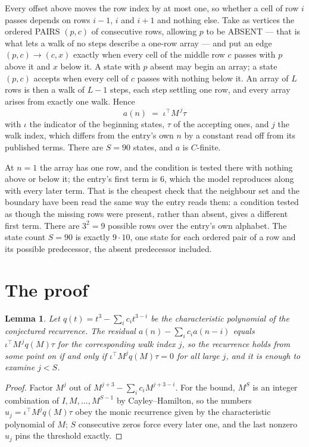 \documentclass[11pt,a4paper]{article}
\theoremstyle{plain}
\newtheorem{lemma}[theorem]{Lemma}
\theoremstyle{definition}
\begin{document}
Every offset above moves the row index by at most one, so whether a cell of row $i$ passes
depends on rows $i-1$, $i$ and $i+1$ and nothing else. Take as vertices the ordered PAIRS
$(p,c)$ of consecutive rows, allowing $p$ to be ABSENT --- that is what lets a walk of no steps
describe a one-row array --- and put an edge $(p,c)\to(c,x)$ exactly when every cell of the
middle row $c$ passes with $p$ above it and $x$ below it. A state with $p$ absent may begin an
array; a state $(p,c)$ accepts when every cell of $c$ passes with nothing below it. An array of
$L$ rows is then a walk of $L-1$ steps, each step settling one row, and every array arises from
exactly one walk. Hence
\[
a(n)\;=\;\iota^{\!\top}M^{\,j}\tau
\]
with $\iota$ the indicator of the beginning states, $\tau$ of the accepting ones, and $j$ the
walk index, which differs from the entry's own $n$ by a constant read off from its published
terms. There are $S=90$ states, and $a$ is $C$-finite.

At $n=1$ the array has one row, and
the condition is tested there with nothing above or below it; the entry's first term is
$6$, which the model reproduces along with every later term. That is the cheapest check
that the neighbour set and the boundary have been read the same way the entry reads them: a
condition tested as though the missing rows were present, rather than absent, gives a different
first term. There are $3^{2}=9$ possible rows over the entry's own alphabet. The state count $S=90$ is exactly $9\cdot10$,
one state for each ordered pair of a row and its possible predecessor, the absent predecessor
included.

\section{The proof}

\begin{lemma}\label{lem:crit}
Let $q(t)=t^{3}-\sum_i c_it^{3-i}$ be the characteristic polynomial of the
conjectured recurrence. The residual $a(n)-\sum_ic_ia(n-i)$ equals
$\iota^{\!\top}M^{\,j}q(M)\tau$ for the corresponding walk index $j$, so the recurrence
holds from some point on if and only if $\iota^{\!\top}M^{j}q(M)\tau=0$ for all large $j$,
and it is enough to examine $j<S$.
\end{lemma}

\begin{proof}
Factor $M^{j}$ out of $M^{j+3}-\sum_ic_iM^{j+3-i}$. For the bound, $M^{S}$
is an integer combination of $I,M,\dots,M^{S-1}$ by Cayley--Hamilton, so the numbers
$u_j=\iota^{\!\top}M^{j}q(M)\tau$ obey the monic recurrence given by the characteristic
polynomial of $M$; $S$ consecutive zeros force every later one, and the last nonzero $u_j$
pins the threshold exactly.
\end{proof}
\end{document}
